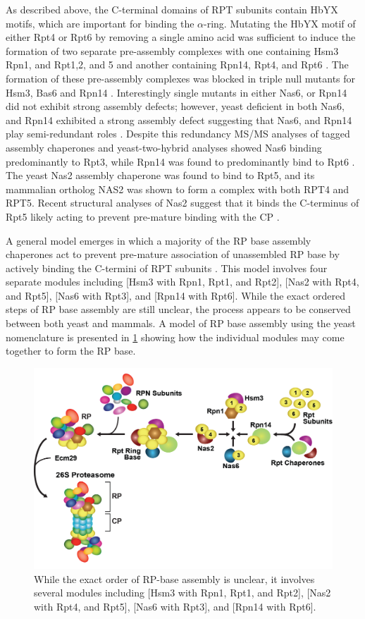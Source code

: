 	As described above, the C-terminal domains of RPT subunits contain HbYX motifs, which are important for binding the $\alpha$-ring. Mutating the HbYX motif of either Rpt4 or Rpt6 by removing a single amino acid was sufficient to induce the formation of two separate pre-assembly complexes with one containing Hsm3 Rpn1, and Rpt1,2, and 5 and another containing Rpn14, Rpt4, and Rpt6 \citep{park09}. The formation of these pre-assembly complexes was blocked in triple null mutants for Hsm3, Bas6 and Rpn14 \citep{park09}. Interestingly single mutants in either Nas6, or Rpn14 did not exhibit strong assembly defects; however, yeast deficient in both Nas6, and Rpn14 exhibited a strong assembly defect suggesting that Nas6, and Rpn14 play semi-redundant roles \citep{saeki09}. Despite this redundancy MS/MS analyses of tagged assembly chaperones and yeast-two-hybrid analyses showed Nas6 binding predominantly to Rpt3, while Rpn14 was found to predominantly bind to Rpt6 \citep{saeki09}.  The yeast Nas2 assembly chaperone was found to bind to Rpt5, and its mammalian ortholog NAS2 was shown to form a complex with both RPT4 and RPT5. Recent structural analyses of Nas2 suggest that it binds the C-terminus of Rpt5 likely acting to prevent pre-mature binding with the CP \citep{satoh14}.

	A general model emerges in which a majority of the RP base assembly chaperones act to prevent pre-mature association of unassembled RP base by actively binding the C-termini of RPT subunits \citep{tomko13}. This model involves four separate modules including [Hsm3 with Rpn1, Rpt1, and Rpt2], [Nas2 with Rpt4, and Rpt5], [Nas6 with Rpt3], and [Rpn14 with Rpt6].  While the exact ordered steps of RP base assembly are still unclear, the process appears to be conserved between both yeast and mammals. A model of RP base assembly using the yeast nomenclature is presented in \ref{fig:rpassembly} showing how the individual modules may come together to form the RP base.

\begin{figure}
	\centering
	\includegraphics[width=\columnwidth]{intro/rpassembly.png}
	{While the exact order of RP-base assembly is unclear, it involves several modules including [Hsm3 with Rpn1, Rpt1, and Rpt2], [Nas2 with Rpt4, and Rpt5], [Nas6 with Rpt3], and [Rpn14 with Rpt6].}
	\label{fig:rpassembly}
\end{figure}

